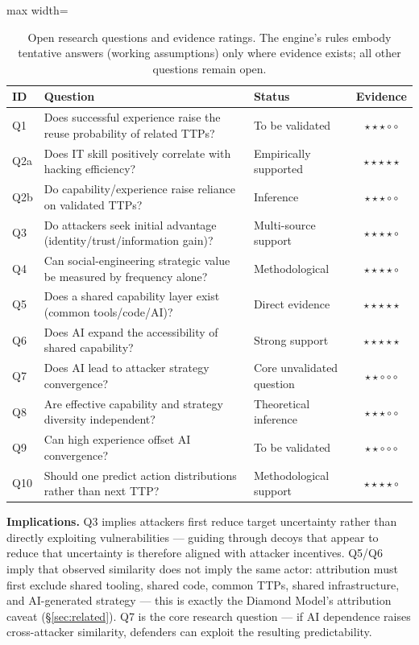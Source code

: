\documentclass[11pt]{article}
\begin{document}
\begin{table}[ht]
\centering
\begin{adjustbox}{max width=\linewidth}\begin{tabular}{@{}lllc@{}}
\toprule
\textbf{ID} & \textbf{Question} & \textbf{Status} & \textbf{Evidence} \\
\midrule
Q1  & Does successful experience raise the reuse probability of related TTPs? & To be validated & $\star\star\star\circ\circ$ \\
Q2a & Does IT skill positively correlate with hacking efficiency? & Empirically supported & $\star\star\star\star\star$ \\
Q2b & Do capability/experience raise reliance on validated TTPs? & Inference & $\star\star\star\circ\circ$ \\
Q3  & Do attackers seek initial advantage (identity/trust/information gain)? & Multi-source support & $\star\star\star\star\circ$ \\
Q4  & Can social-engineering strategic value be measured by frequency alone? & Methodological & $\star\star\star\star\circ$ \\
Q5  & Does a shared capability layer exist (common tools/code/AI)? & Direct evidence & $\star\star\star\star\star$ \\
Q6  & Does AI expand the accessibility of shared capability? & Strong support & $\star\star\star\star\star$ \\
Q7  & Does AI lead to attacker strategy convergence? & Core unvalidated question & $\star\star\circ\circ\circ$ \\
Q8  & Are effective capability and strategy diversity independent? & Theoretical inference & $\star\star\star\circ\circ$ \\
Q9  & Can high experience offset AI convergence? & To be validated & $\star\star\circ\circ\circ$ \\
Q10 & Should one predict action distributions rather than next TTP? & Methodological support & $\star\star\star\star\circ$ \\
\bottomrule
\end{tabular}\end{adjustbox}
\caption{Open research questions and evidence ratings. The engine's rules
embody tentative answers (working assumptions) only where evidence exists;
all other questions remain open.}
\label{tab:hypotheses}
\end{table}

\textbf{Implications.} Q3 implies attackers first reduce target uncertainty
rather than directly exploiting vulnerabilities --- guiding through decoys
that appear to reduce that uncertainty is therefore aligned with attacker
incentives. Q5/Q6 imply that observed similarity does not imply the same
actor: attribution must first exclude shared tooling, shared code, common
TTPs, shared infrastructure, and AI-generated strategy --- this is exactly
the Diamond Model's attribution caveat (\S\ref{sec:related}). Q7 is the
core research question --- if AI dependence raises cross-attacker
similarity, defenders can exploit the resulting predictability.
\end{document}
